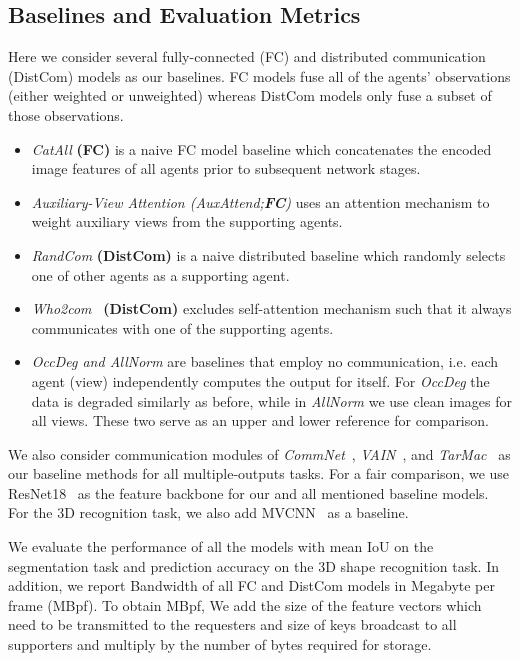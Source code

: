 \subsection{Baselines and Evaluation Metrics}
Here we consider several fully-connected (FC) and distributed communication (DistCom) models as our baselines. FC models fuse all of the agents' observations (either weighted or unweighted) whereas DistCom models only fuse a subset of those observations.

\begin{itemize}[topsep=0pt,itemsep=-1ex,partopsep=1ex,parsep=1ex,labelindent=0.0em,labelsep=0.2cm,leftmargin=*]

\item \textit{CatAll} \textbf{(FC)} is a naive FC model baseline which concatenates the encoded image features of all agents prior to subsequent network stages.

\item \textit{Auxiliary-View Attention (AuxAttend;\textbf{FC})} uses an attention mechanism to weight auxiliary views from the supporting agents. 

\item  \textit{RandCom} \textbf{(DistCom)} is a naive distributed baseline which randomly selects one of other agents as a supporting agent. 

\item \textit{Who2com}~\cite{liu2020who2com} \textbf{(DistCom)} excludes self-attention mechanism such that it always communicates with one of the supporting agents. 

\item \textit{OccDeg and AllNorm} are baselines that employ no communication, i.e. each agent (view) independently computes the output for itself. For \textit{OccDeg} the data is degraded similarly as before, while in \textit{AllNorm} we use clean images for all views. These two serve as an upper and lower reference for comparison. 
\end{itemize}

We also consider communication modules of \textit{CommNet}~\cite{sukhbaatar2016learning}, \textit{VAIN}~\cite{hoshen2017vain}, and \textit{TarMac}~\cite{das2019tarmac} as our baseline methods for all multiple-outputs tasks. 
For a fair comparison, we use ResNet18~\cite{he2016deep} as the feature backbone for our and all mentioned  baseline models. For the 3D recognition task, we also add MVCNN~\cite{wu20153d} as a baseline.

We evaluate the performance of all the models with mean IoU on the segmentation task and prediction accuracy on the 3D shape recognition task. In addition, we report Bandwidth of all FC and DistCom models in Megabyte per frame (MBpf). To obtain MBpf, We add the size of the feature vectors which need to be transmitted to the requesters and size of keys broadcast to all supporters and multiply by the number of bytes required for storage.
